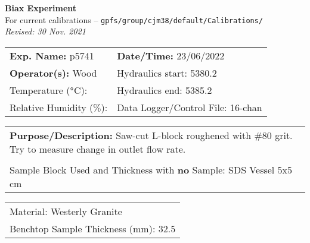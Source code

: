 \documentclass[letterpaper, 10pt]{article}
\begin{document}
\begin{center}
    {\Large \textbf{Biax Experiment}}\\
    {\small For current calibrations -- \texttt{gpfs/group/cjm38/default/Calibrations/}}\\
    {\footnotesize \textit{Revised: 30 Nov. 2021}}
\end{center}



\begin{table}[!ht]
	\renewcommand{\arraystretch}{1.1}
	\begin{tabular}{p{10cm} p{10cm} }
	    \textbf{Exp. Name: }p5741 & \textbf{Date/Time: }23/06/2022\\
	    \textbf{Operator(s): }Wood & Hydraulics start: 5380.2 \\
	    Temperature ($\degree$C):  & Hydraulics end: 5385.2 \\
	    Relative Humidity ($\%$):  & Data Logger/Control File: 16-chan \\
	\end{tabular}
\end{table} 
\vspace{-0.5cm} 

\begin{table}[!ht]
	\renewcommand{\arraystretch}{1.1}
	\begin{tabular}{p{20cm}}\textbf{Purpose/Description:} Saw-cut L-block roughened with \#80 grit. Try to measure change in outlet flow rate.\\  \\Sample Block Used and Thickness with \textbf{no} Sample: SDS Vessel 5x5 cm \\
	\end{tabular}
    \end{table} \vspace{-0.5cm} 

\begin{table}[!ht]
        \small
        \renewcommand{\arraystretch}{1.2}
        \begin{tabular}{ |p{7cm}| } \hline 
Material: Westerly Granite \\Benchtop Sample Thickness (mm): 32.5 \\ \hline \end{tabular} \end{table} \vspace{-0.5cm} 
\end{document}
